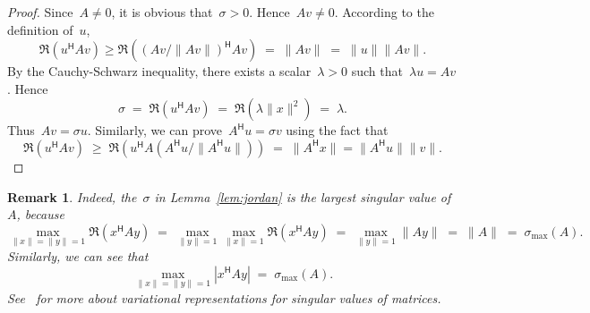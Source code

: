\documentclass[11pt,a4paper]{article}
\newtheorem{remark}{Remark}%
\theoremstyle{definition}
\newcommand{\hmt}{{\scriptscriptstyle{{\mathsf{H}}}}}
\begin{document}
\begin{proof}
  Since~$A\neq 0$, it is obvious that~$\sigma >0$. Hence~$Av \neq 0$. According to the definition
  of~$u$,
  \begin{equation*}
    \Re(u^\hmt Av)\ge \Re(\left({Av}/{\|Av\|}\right)^\hmt Av) \;=\;
    \|Av\|\;=\;\|u\|\|Av\|.
  \end{equation*}
  By the Cauchy-Schwarz inequality, there exists a scalar~$\lambda>0$ such
  that~$\lambda u = Av$. Hence%
  \begin{equation*}
    \sigma \;=\; \Re(u^\hmt Av) \;=\; \Re(\lambda \|x\|^2) \;=\; \lambda.  
  \end{equation*}
  Thus~$Av = \sigma u$. Similarly, we can prove~$A^\hmt u = \sigma v$ using the fact that
  \begin{equation*}
    \Re(u^\hmt A v)\;\ge\; \Re(u^\hmt A\left( A^\hmt u/\|A^\hmt
    u\|\right)) \;=\; \|A^\hmt x\| = \|A^\hmt u\|\|v\|.
  \end{equation*}
\end{proof}

\begin{remark}
  Indeed, the~$\sigma$ in Lemma~\ref{lem:jordan} is the largest singular value of~$A$, because
  \begin{equation*}
    \max_{\|x\|=\|y\|=1} \Re(x^\hmt A y) \;=\; \max_{\|y\|=1}\max_{\|x\|=1}\Re(x^\hmt Ay)
    \;=\;\max_{\|y\|=1}\|Ay\| \;=\; \|A\|\;=\;\sigma_{\max}(A).
  \end{equation*}
  Similarly, we can see that
  \begin{equation*}
    \max_{\|x\|=\|y\|=1}|x^\hmt A y| \;=\; \sigma_{\max}(A).
  \end{equation*}
  See~\cite{Cao_Feng_2003} for more about variational representations for singular values of matrices.
\end{remark}
\end{document}
